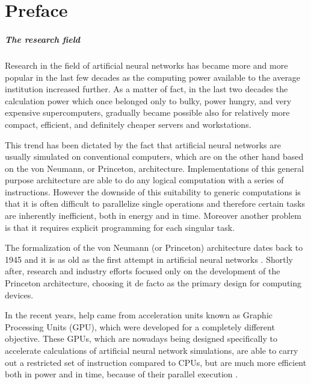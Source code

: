\chapter*{Preface}

\paragraph{The research field\\}
Research in the field of artificial neural networks has became more and more popular in the last few decades as the computing power available to the average institution increased further.
As a matter of fact, in the last two decades the calculation power which once belonged only to bulky, power hungry, and very expensive supercomputers, gradually became possible also for relatively more compact, efficient, and definitely cheaper servers and workstations.

This trend has been dictated by the fact that artificial neural networks are usually simulated on conventional computers, which are on the other hand based on the von Neumann, or Princeton, architecture.
Implementations of this general purpose architecture are able to do any logical computation with a series of instructions.
However the downside of this suitability to generic computations is that it is often difficult to parallelize single operations and therefore certain tasks are inherently inefficient, both in energy and in time.
Moreover another problem is that it requires explicit programming for each singular task.

The formalization of the von Neumann (or Princeton) architecture dates back to 1945 \cite{Godfrey1993} and it is as old as the first attempt in artificial neural networks \cite{Rosenblatt1958}.
Shortly after, research and industry efforts focused only on the development of the Princeton architecture, choosing it de facto as the primary design for computing devices.

In the recent years, help came from acceleration units known as Graphic Processing Units (GPU), which were developed for a completely different objective.
These GPUs, which are nowadays being designed specifically to accelerate calculations of artificial neural network simulations, are able to carry out a restricted set of instruction compared to CPUs, but are much more efficient both in power and in time, because of their parallel execution \cite{stone2010opencl,DBLP:journals/corr/abs-1211-5590}.


